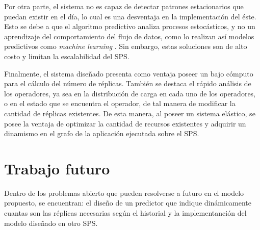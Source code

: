 Por otra parte, el sistema no es capaz de detectar patrones estacionarios que puedan existir en el día, lo cual es una desventaja en la implementación del éste. Esto se debe a que el algoritmo predictivo analiza procesos estocásticos, y no un aprendizaje del comportamiento del flujo de datos, como lo realizan así modelos predictivos como \textit{machine learning} \citep{bookMohri2012}. Sin embargo, estas soluciones son de alto costo y limitan la escalabilidad del SPS.

Finalmente, el sistema diseñado presenta como ventaja poseer un bajo cómputo para el cálculo del número de réplicas. También se destaca el rápido análisis de los operadores, ya sea en la distribución de carga en cada uno de los operadores, o en el estado que se encuentra el operador, de tal manera de modificar la cantidad de réplicas existentes. De esta manera, al poseer un sistema elástico, se posee la ventaja de optimizar la cantidad de recursos existentes y adquirir un dinamismo en el grafo de la aplicación ejecutada sobre el SPS.

\section{Trabajo futuro}

Dentro de los problemas abierto que pueden resolverse a futuro en el modelo propuesto, se encuentran: el diseño de un predictor que indique dinámicamente cuantas son las réplicas necesarias según el historial y la implementanción del modelo diseñado en otro SPS.



